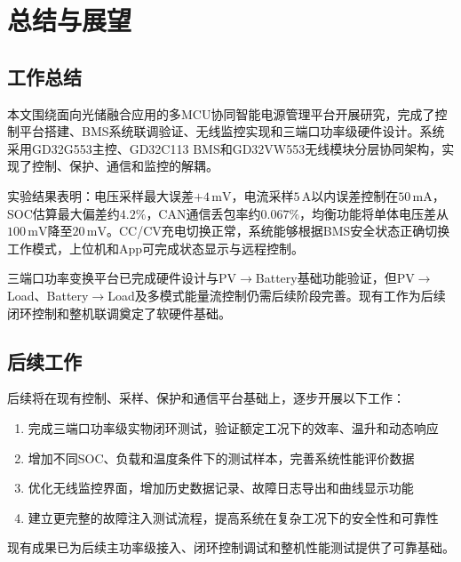 
\section{总结与展望}

\subsection{工作总结}

本文围绕面向光储融合应用的多MCU协同智能电源管理平台开展研究，完成了控制平台搭建、BMS系统联调验证、无线监控实现和三端口功率级硬件设计。系统采用GD32G553主控、GD32C113 BMS和GD32VW553无线模块分层协同架构，实现了控制、保护、通信和监控的解耦。

实验结果表明：电压采样最大误差$+4\,\mathrm{mV}$，电流采样$5\,\mathrm{A}$以内误差控制在$50\,\mathrm{mA}$，SOC估算最大偏差约$4.2\%$，CAN通信丢包率约$0.067\%$，均衡功能将单体电压差从$100\,\mathrm{mV}$降至$20\,\mathrm{mV}$。CC/CV充电切换正常，系统能够根据BMS安全状态正确切换工作模式，上位机和App可完成状态显示与远程控制。

三端口功率变换平台已完成硬件设计与PV$\rightarrow$Battery基础功能验证，但PV$\rightarrow$Load、Battery$\rightarrow$Load及多模式能量流控制仍需后续阶段完善。现有工作为后续闭环控制和整机联调奠定了软硬件基础。

\subsection{后续工作}

后续将在现有控制、采样、保护和通信平台基础上，逐步开展以下工作：

\begin{enumerate}[label=\arabic*),leftmargin=*,itemsep=0.3ex]
  \item 完成三端口功率级实物闭环测试，验证额定工况下的效率、温升和动态响应
  \item 增加不同SOC、负载和温度条件下的测试样本，完善系统性能评价数据
  \item 优化无线监控界面，增加历史数据记录、故障日志导出和曲线显示功能
  \item 建立更完整的故障注入测试流程，提高系统在复杂工况下的安全性和可靠性
\end{enumerate}

现有成果已为后续主功率级接入、闭环控制调试和整机性能测试提供了可靠基础。
